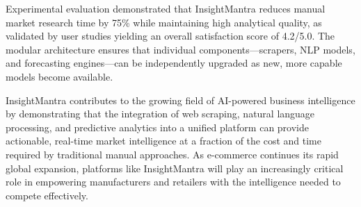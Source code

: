\documentclass[conference]{IEEEtran}
\begin{document}
Experimental evaluation demonstrated that InsightMantra reduces manual market research time by 75\% while maintaining high analytical quality, as validated by user studies yielding an overall satisfaction score of 4.2/5.0. The modular architecture ensures that individual components---scrapers, NLP models, and forecasting engines---can be independently upgraded as new, more capable models become available.

InsightMantra contributes to the growing field of AI-powered business intelligence by demonstrating that the integration of web scraping, natural language processing, and predictive analytics into a unified platform can provide actionable, real-time market intelligence at a fraction of the cost and time required by traditional manual approaches. As e-commerce continues its rapid global expansion, platforms like InsightMantra will play an increasingly critical role in empowering manufacturers and retailers with the intelligence needed to compete effectively.
\end{document}
